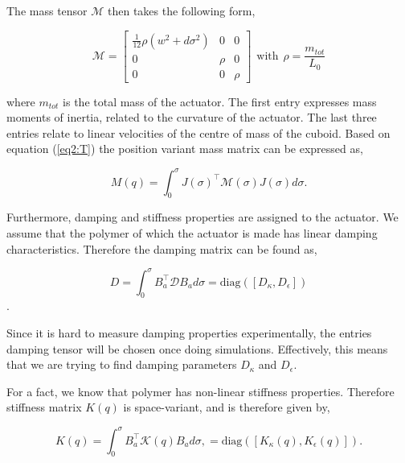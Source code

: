 The mass tensor $\mathcal{M}$ then takes the following form,

\begin{equation}
    \mathcal{M} = \begin{bmatrix} \frac{1}{12}\rho (w^2 + d\sigma^2) & 0 & 0 \\
                                   0 & \rho & 0 \\
                                   0 & 0 & \rho \end{bmatrix}\hspace{5pt} \text{with} \hspace{5pt} \rho = \frac{m_{tot}}{L_0}
\end{equation} 




where $m_{tot}$ is the total mass of the actuator. The first entry expresses mass moments of inertia, related to the curvature of the actuator. The last three entries relate to linear velocities of the centre of mass of the cuboid. Based on equation (\ref{eq2:T}) the position variant mass matrix can be expressed as, 


\begin{equation}
    M(q) = \int_0^{\sigma} J(\sigma)^\top \mathcal{M}(\sigma)J(\sigma) d \sigma.
\end{equation}

Furthermore, damping and stiffness properties are assigned to the actuator. We assume that the polymer of which the actuator is made has linear damping characteristics. Therefore the damping matrix can be found as,

\begin{equation}
    D = \int_0^\sigma B_a^\top \mathcal{D} B_a d \sigma  = \text{diag}([D_\kappa, D_\epsilon])
\end{equation}.

Since it is hard to measure damping properties experimentally, the entries damping tensor will be chosen once doing simulations. Effectively, this means that we are trying to find damping parameters $D_\kappa$ and $D_\epsilon$. 

For a fact, we know that polymer has non-linear stiffness properties. Therefore stiffness matrix $K(q)$ is space-variant, and is therefore given by,

\begin{equation}
    K(q) = \int_0^\sigma B_a^\top \mathcal{K}(q) B_a  d\sigma, = \text{diag}([K_\kappa(q), K_\epsilon(q)]).
\end{equation}


